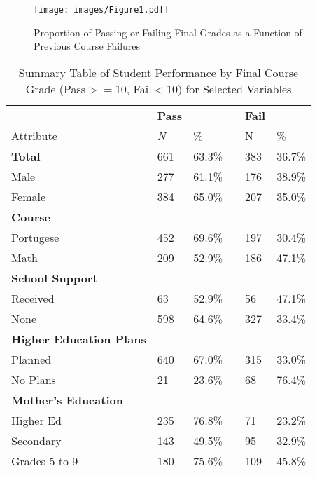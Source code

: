 \documentclass[sigconf]{acmart}
\begin{document}

\begin{figure}[!ht]
  \centering\texttt{[image: images/Figure1.pdf]}
  \caption{Proportion of Passing or Failing Final Grades as a 
  Function of Previous Course Failures}
  \label{f:Figure1}
\end{figure} 
 
 
 
\begin{table}
  \caption{Summary Table of Student Performance by Final Course Grade 
  (Pass$>=$10, Fail$<$10) for Selected Variables}
  \label{tab:freq}
  \begin{tabular}{llllll}
    \toprule
                    &  \textbf{Pass} & & & \textbf{Fail} & \\
    Attribute & \textit{N} & \% &  & N & \% \\
    \midrule
    \textbf{Total}  & 661 & 63.3\% & & 383 & 36.7\% \\
    \midrule
    Male            & 277 & 61.1\% & & 176 & 38.9\%  \\
    Female          & 384 & 65.0\% & & 207 & 35.0\%  \\
    \midrule
    \textbf{Course} &  &  &  &  & \\
    Portugese       & 452 & 69.6\% & & 197 & 30.4\%  \\
    Math            & 209 & 52.9\% & & 186 & 47.1\%  \\  
    \midrule
    \textbf{School Support} &  &  &  &  & \\
    Received        &  63 & 52.9\% & &  56 & 47.1\%  \\
    None            & 598 & 64.6\% & & 327 & 33.4\%  \\ 
    \midrule    
    \textbf{Higher Education Plans} &  &  &  &  & \\
    Planned         & 640 & 67.0\% & & 315 & 33.0\%  \\
    No Plans        &  21 & 23.6\% & &  68 & 76.4\%  \\
    \midrule
    \textbf{Mother's Education} &  &  &  &  & \\
    Higher Ed       & 235 & 76.8\% & &  71 & 23.2\% \\
    Secondary       & 143 & 49.5\% & &  95 & 32.9\% \\
    Grades 5 to 9   & 180 & 75.6\% & & 109 & 45.8\% \\

\end{tabular}
\end{table}
\end{document}
